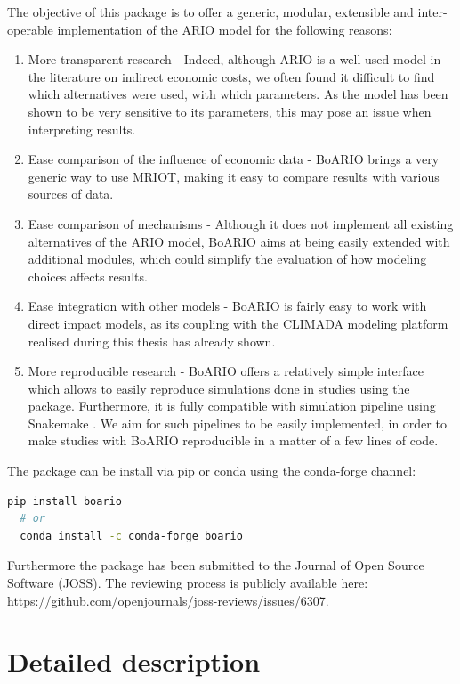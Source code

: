 \documentclass[main.tex]{subfiles}
\begin{document}
The objective of this package is to offer a generic, modular, extensible and
inter-operable implementation of the ARIO model for the following reasons:
\begin{enumerate}
\item More transparent research - Indeed, although ARIO is a well used model in
  the literature on indirect economic costs, we often found it difficult to find which
  alternatives were used, with which parameters. As the model has been shown to
  be very sensitive to its parameters, this may pose an issue when interpreting
  results.
\item Ease comparison of the influence of economic data - BoARIO brings a very
  generic way to use MRIOT, making it easy to compare results with various
  sources of data.
\item Ease comparison of mechanisms - Although it does not implement all
  existing alternatives of the ARIO model, BoARIO aims at being easily extended
  with additional modules, which could simplify the evaluation of how modeling
  choices affects results.
\item Ease integration with other models - BoARIO is fairly easy to work
  with direct impact models, as its coupling with the CLIMADA modeling platform
  realised during this thesis has already shown.
\item More reproducible research - BoARIO offers a relatively simple interface
  which allows to easily reproduce simulations done in studies using the
  package. Furthermore, it is fully compatible with simulation pipeline using
  Snakemake \parencite{koester-2012-snakem-scalab}. We aim for such pipelines to
  be easily implemented, in order to make studies with BoARIO reproducible in a
  matter of a few lines of code.
\end{enumerate}

The package can be install via pip or conda using the conda-forge channel:
\begin{lstlisting}[language=bash]
  pip install boario
  # or
  conda install -c conda-forge boario
\end{lstlisting}

Furthermore the package has been submitted to the Journal of Open Source
Software (JOSS). The reviewing process is publicly available here:
\url{https://github.com/openjournals/joss-reviews/issues/6307}.

\section{Detailed description}
\label{sec:full-description-ARIO}
\end{document}
